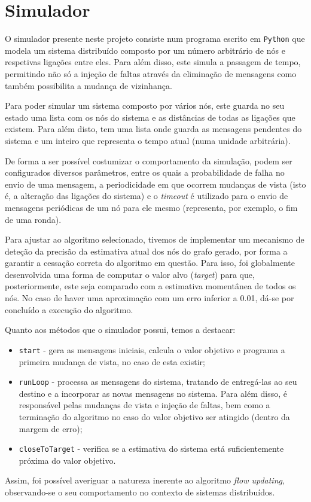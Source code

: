 \documentclass[a4paper]{report}
\begin{document}
{\let\clearpage\relax \chapter{Simulador} \label{ch:Simulator}}
\large{
	O simulador presente neste projeto consiste num programa escrito em \texttt{Python} que modela um sistema distribuído composto por um número arbitrário de nós e respetivas ligações entre eles.
	Para além disso, este simula a passagem de tempo, permitindo não só a injeção de faltas através da eliminação de mensagens como também possibilita a mudança de vizinhança.
	
	Para poder simular um sistema composto por vários nós, este guarda no seu estado uma lista com os nós do sistema e as distâncias de todas as ligações que existem. Para além disto, tem uma lista onde guarda as mensagens pendentes do sistema e um inteiro que representa o tempo atual (numa unidade arbitrária).
	
	De forma a ser possível costumizar o comportamento da simulação, podem ser configurados diversos parâmetros, entre os quais a probabilidade de falha no envio de uma mensagem, a periodicidade em que ocorrem mudanças de vista (isto é, a alteração das ligações do sistema) e o \textit{timeout} é utilizado para o envio de mensagens periódicas de um nó para ele mesmo (representa, por exemplo, o fim de uma ronda).
	
	Para ajustar ao algoritmo selecionado, tivemos de implementar um mecanismo de deteção da precisão da estimativa atual dos nós do grafo gerado, por forma a garantir a cessação correta do algoritmo em questão.
	Para isso, foi globalmente desenvolvida uma forma de computar o valor alvo (\textit{target}) para que, posteriormente, este seja comparado com a estimativa momentânea de todos os nós. No caso de haver uma aproximação com um erro inferior a 0.01, dá-se por concluído a execução do algoritmo.

	Quanto aos métodos que o simulador possui, temos a destacar:
	\begin{itemize}
		\item \texttt{start} - gera as mensagens iniciais, calcula o valor objetivo e programa a primeira mudança de vista, no caso de esta existir;
		\item \texttt{runLoop} - processa as mensagens do sistema, tratando de entregá-las ao seu destino e a incorporar as novas mensagens no sistema. Para além disso, é responsável pelas mudanças de vista e injeção de faltas, bem como a terminação do algoritmo no caso do valor objetivo ser atingido (dentro da margem de erro);
		\item \texttt{closeToTarget} - verifica se a estimativa do sistema está suficientemente próxima do valor objetivo.
	\end{itemize}

	Assim, foi possível averiguar a natureza inerente ao algoritmo \textit{flow updating}, observando-se o seu comportamento no contexto de sistemas distribuídos.
}
\end{document}
